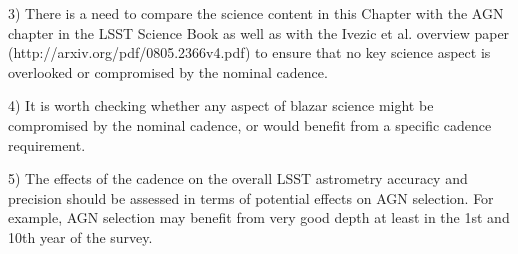 3) There is a need to compare the science content in this Chapter
with the AGN chapter in the LSST Science Book as well as with the
Ivezic et al. overview paper (http://arxiv.org/pdf/0805.2366v4.pdf)
to ensure that no key science aspect is overlooked or compromised
by the nominal cadence.






4) It is worth checking whether
any aspect of blazar science might be compromised by the nominal cadence, or
would benefit from a specific cadence requirement.

5) The effects of the cadence on the overall LSST astrometry accuracy and precision
should be assessed in terms of potential effects on AGN selection. For example,
AGN selection may benefit from very good depth at least in the 1st and 10th year of the
survey.


\navigationbar

